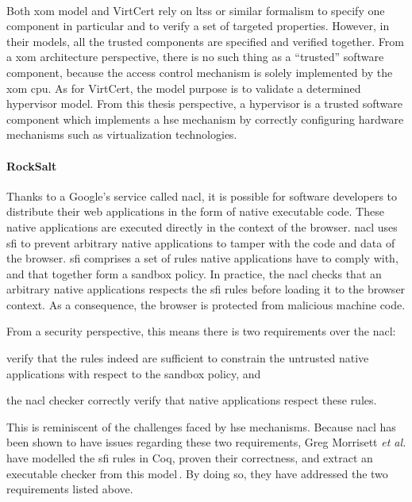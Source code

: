 \paragraph{}
%
Both \ac{xom} model and VirtCert rely on \acp{lts} or similar formalism to
specify one component in particular and to verify a set of targeted properties.
%
However, in their models, all the trusted components are specified and verified
together.
%
From a \ac{xom} architecture perspective, there is no such thing as a
``trusted'' software component, because the access control mechanism is solely
implemented by the \ac{xom} \ac{cpu}.
%
As for VirtCert, the model purpose is to validate a determined hypervisor model.
%
From this thesis perspective, a hypervisor is a trusted software component which
implements a \ac{hse} mechanism by correctly configuring hardware mechanisms
such as virtualization technologies.
%

\paragraph{RockSalt}
%
Thanks to a Google's service called \ac{nacl}, it is possible for software
developers to distribute their web applications in the form of native executable
code.
%
These native applications are executed directly in the context of the browser.
%
\ac{nacl} uses \ac{sfi} to prevent arbitrary native applications to tamper with
the code and data of the browser.
%
\ac{sfi} comprises a set of rules native applications have to comply with, and
that together form a sandbox policy.
%
In practice, the \ac{nacl} checks that an arbitrary native applications respects
the \ac{sfi} rules before loading it to the browser context.
%
As a consequence, the browser is protected from malicious machine code.

From a security perspective, this means there is two requirements over the
\ac{nacl}:
%
\begin{inparaenum}[(1)]
\item verify that the rules indeed are sufficient to constrain the untrusted
  native applications with respect to the sandbox policy, and
%
\item the \ac{nacl} checker correctly verify that native applications respect
  these rules.
\end{inparaenum}
%
This is reminiscent of the challenges faced by \ac{hse} mechanisms.
%
Because \ac{nacl} has been shown to have issues regarding these two
requirements, Greg Morrisett \emph{et al.} have modelled the \ac{sfi} rules in
Coq, proven their correctness, and extract an executable checker from this
model\,\cite{morrisett2012rocksalt}.
%
By doing so, they have addressed the two requirements listed above.

